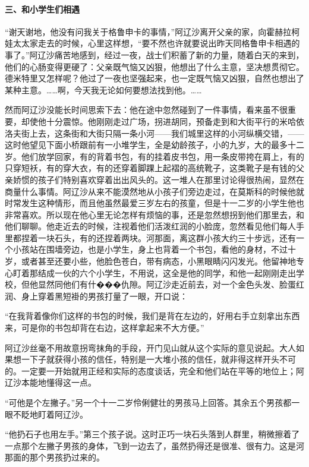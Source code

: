 \paragraph*{三、和小学生们相遇}
\par “谢天谢地，他没有问我关于格鲁申卡的事情，”阿辽沙离开父亲的家，向霍赫拉柯娃太太家走去的时候，心里这样想，“要不然也许就要说出昨天同格鲁申卡相遇的事了。”阿辽沙痛苦地感到，经过一夜，战士们积蓄了新的力量，随着白天的来到，他们的心肠变得更硬了：父亲既气恼又凶狠，他想出了什么主意，坚决想贯彻它。德米特里又怎样呢？他过了一夜也坚强起来，也一定既气恼又凶狠，自然也想出了某种主意。……啊，今天我无论如何要想法找到他。……
\par 然而阿辽沙没能长时间思索下去：他在途中忽然碰到了一件事情，看来虽不很重要，却使他十分震惊。他刚刚走过广场，拐进胡同，预备走到和大街平行的米哈依洛夫街上去，这条街和大街只隔一条小河——我们城里这样的小河纵横交错，——这时他望见下面小桥跟前有一小堆学生，全是幼龄孩子，小的九岁，大的最多十二岁。他们放学回家，有的背着书包，有的挂着皮书包，用一条皮带挎在肩上，有的只穿短袄，有的穿大衣，有的还穿着脚踝上起褶的高统靴子，这类靴子是有钱的父亲娇惯的孩子们特别喜欢穿着出出风头的。这一堆人在那里讨论得很热闹，显然在商量什么事情。阿辽沙从来不能漠然地从小孩子们旁边走过，在莫斯科的时候他就时常发生这种情形，而且他虽然最爱三岁左右的孩童，但是十一二岁的小学生他也非常喜欢。所以现在他心里无论怎样有烦恼的事，还是忽然想拐到他们那里去，和他们聊聊。他走近去的时候，注视着他们活泼红润的小脸庞，忽然看见他们每人手里都捏着一块石头，有的还捏着两块。河那面，离这群小孩大约三十步远，还有一个小孩站在围墙旁边，也是小学生，身上也背着一个书包，看他的身材，不过十岁，或者甚至还要小些，他脸色苍白，带有病态，小黑眼睛闪闪发光。他留神地专心盯着那结成一伙的六个小学生，不用说，这全是他的同学，和他一起刚刚走出学校，但他显然同他们有什���仇隙。阿辽沙走近前去，对一个金色头发、脸蛋红润、身上穿着黑短褂的男孩打量了一眼，开口说：
\par “在我背着像你们这样的书包的时候，我们是背在左边的，好用右手立刻拿出东西来，可是你的书包却背在右边，这样拿起来不大方便。”
\par 阿辽沙丝毫不用故意拐弯抹角的手段，开门见山就从这个实际的意见说起。大人如果想一下子就获得小孩的信任，特别是一大堆小孩的信任，就非得这样开头不可的。一定要一开始就用正经和实际的态度谈话，完全和他们站在平等的地位上；阿辽沙本能地懂得这一点。
\par “可他是个左撇子。”另一个十一二岁伶俐健壮的男孩马上回答。其余五个男孩都一眼不眨地盯着阿辽沙。
\par “他扔石子也用左手。”第三个孩子说。这时正巧一块石头落到人群里，稍微擦着了一点那个左撇子男孩的身体，飞到一边去了，虽然扔得还是很准、很有力。这是河那面的那个男孩扔过来的。
